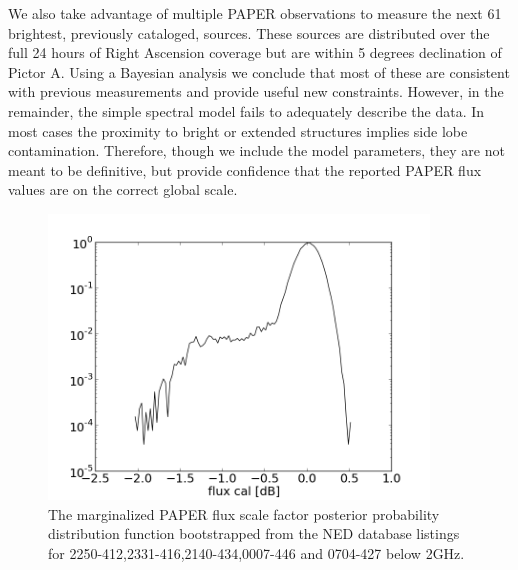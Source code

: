 \documentclass[preprint]{aastex}
\begin{document}
We also take advantage of multiple PAPER observations to measure the next  61
brightest, previously cataloged, sources. These sources are distributed over
the full 24 hours of Right Ascension coverage but are within 5 degrees
declination of Pictor A.  Using a Bayesian analysis we conclude that most of
these are consistent with previous measurements and provide useful new
constraints. However, in the remainder, the simple spectral model fails to
adequately describe the data. In most cases the proximity to bright or extended
structures implies side lobe contamination.  Therefore, though we include the
model parameters, they are not meant to be definitive, but provide confidence
that the reported PAPER flux values are on the correct global scale.



\begin{figure}
\centering
\includegraphics[width=0.9\textwidth]{plots/2250-412_2331-416_2140-434_0007-446_0704-427_gain_mcmc_chain_gain_conf.png}
\caption{
The marginalized PAPER flux scale factor posterior probability distribution
function bootstrapped from the NED database listings for
2250-412,2331-416,2140-434,0007-446 and 0704-427 below 2GHz.
\label{fig:gain}}
\end{figure}
\end{document}
